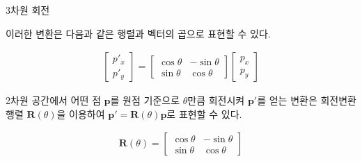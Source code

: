 \documentclass{beamer}
\begin{document}
\begin{frame}{3차원 회전}

이러한 변환은 다음과 같은 행렬과 벡터의 곱으로 표현할 수 있다.

\begin{eqnarray}
\left [
\begin{array}{c}
p'_x \\ p'_y
\end{array}
\right ] =
\left [
\begin{array}{cc}
\cos \theta & - \sin \theta \\
\sin \theta & \cos \theta
\end{array}
\right ]
\left [
\begin{array}{c}
p_x \\
p_y
\end{array}
\right ] \nonumber
\end{eqnarray}

2차원 공간에서 어떤 점 $\mathbf p$를 원점 기준으로 $\theta$만큼 회전시켜 $\mathbf p'$를 얻는 변환은 회전변환 행렬 $\mathbf R(\theta)$을
이용하여 $\mathbf p' = \mathbf R(\theta) \mathbf p$로 표현할 수 있다.

\begin{eqnarray}
\mathbf R(\theta) = \left [ 
\begin{array}{cc}
\cos \theta & - \sin \theta \\
\sin \theta & \cos \theta
\end{array}
\right ] \nonumber
\end{eqnarray} 



\end{frame}
\end{document}
